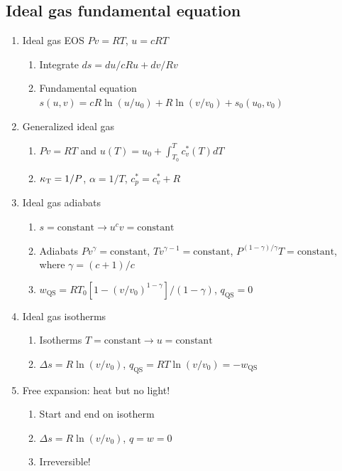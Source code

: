 \documentclass[11pt]{article}
\begin{document}
\subsection{Ideal gas fundamental equation}
\label{sec:orgb821acd}
\begin{enumerate}
\item Ideal gas EOS \(Pv=RT\), \(u=cRT\)
\begin{enumerate}
\item Integrate \(ds = du/cRu + dv/Rv\)
\item Fundamental equation \(s(u,v)=cR \ln(u/u_0)+R  \ln (v/v_0) + s_0(u_0,v_0)\)
\end{enumerate}
\item Generalized ideal gas
\begin{enumerate}
\item \(Pv=RT\) and \(u(T) = u_0 + \int_{T_0}^T c_v^*(T) dT\)
\item \(\kappa_{\rm T} = 1/P\), \(\alpha=1/T\), \(c_p^*=c_v^*+R\)
\end{enumerate}
\item Ideal gas adiabats
\begin{enumerate}
\item \(s =\text{constant} \rightarrow u^cv = \text{constant}\)
\item Adiabats \(P v^\gamma = \text{constant}\), \(T v^{\gamma-1}=\text{constant}\), \(P^{(1-\gamma)/\gamma}T  = \text{constant}\), where \(\gamma=(c+1)/c\)
\item \(w_\text{QS}=R T_0 \left [ 1-(v/v_0)^{1-\gamma} \right ]/(1-\gamma)\), \(q_\text{QS}=0\)
\end{enumerate}
\item Ideal gas isotherms
\begin{enumerate}
\item Isotherms \(T = \text{constant} \rightarrow u = \text{constant}\)
\item \(\Delta s = R \ln(v/v_0)\), \(q_\text{QS}=RT \ln(v/v_0)=-w_\text{QS}\)
\end{enumerate}
\item Free expansion: heat but no light!
\begin{enumerate}
\item Start and end on isotherm
\item \(\Delta s = R \ln(v/v_0)\), \(q =w =0\)
\item Irreversible!
\end{enumerate}
\end{enumerate}
\end{document}

